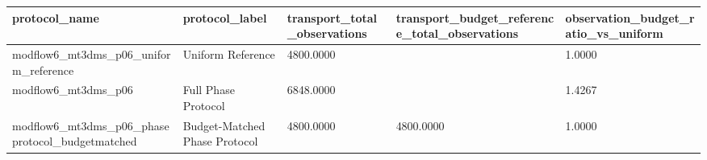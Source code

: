 \begin{tabular}{lllll}
\hline
protocol_name & protocol_label & transport_total_observations & transport_budget_reference_total_observations & observation_budget_ratio_vs_uniform \\
\hline
modflow6\_mt3dms\_p06\_uniform\_reference & Uniform Reference & 4800.0000 &  & 1.0000 \\
modflow6\_mt3dms\_p06 & Full Phase Protocol & 6848.0000 &  & 1.4267 \\
modflow6\_mt3dms\_p06\_phaseprotocol\_budgetmatched & Budget-Matched Phase Protocol & 4800.0000 & 4800.0000 & 1.0000 \\
\hline
\end{tabular}
